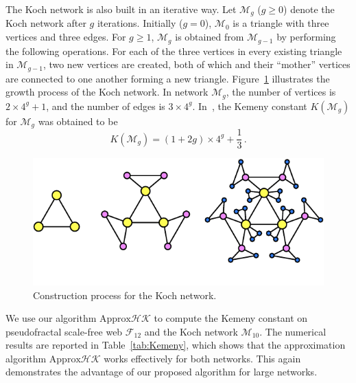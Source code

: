 \documentclass[journal]{IEEEtran}
\begin{document}
The Koch network is also built in an iterative way. Let \(\mathcal{M}_{g}\) (\(g \geq 0\)) denote the Koch network after \(g\) iterations. Initially (\(g=0\)), \(\mathcal{M}_{0}\) is a triangle with three
vertices and three edges. For \(g\geq 1\), \(\mathcal{M}_{g}\) is obtained from \(\mathcal{M}_{g-1}\) by
performing the following operations. For each of the three vertices in
every existing triangle in \(\mathcal{M}_{g-1}\), two new vertices are created, both of which and their
``mother'' vertices are connected to one another forming a new triangle. Figure~\ref{network} illustrates the growth process of the Koch network.  In network \(\mathcal{M}_{g}\), the number of vertices is \(2\times 4^{g}+1\), and the number of
edges is \(3\times 4^{g}\).  In~\cite{XiLiZh15}, the Kemeny constant \(K(\mathcal{M}_g)\) for \(\mathcal{M}_g\) was obtained to be
\begin{equation}\label{Kg02}
    K(\mathcal{M}_g)=(1+2g)\times 4^g+\frac{1}{3}\,. %
\end{equation}

\begin{figure}[!t]
    \centering
    \includegraphics[width=0.85\linewidth]{Koch-eps-converted-to.pdf}
    \caption{Construction process for the Koch network.}
    \label{network}
\end{figure}

We use our  algorithm \(\text{Approx}\mathcal{HK}\) to compute the Kemeny constant on  pseudofractal scale-free web \(\mathcal{F}_{12}\) and the Koch network \(\mathcal{M}_{10}\). The numerical results are reported in  Table~\ref{tab:Kemeny}, which shows that the approximation algorithm \(\text{Approx}\mathcal{HK}\) works effectively for both networks. This again demonstrates the advantage of our proposed algorithm for large networks.
\end{document}
